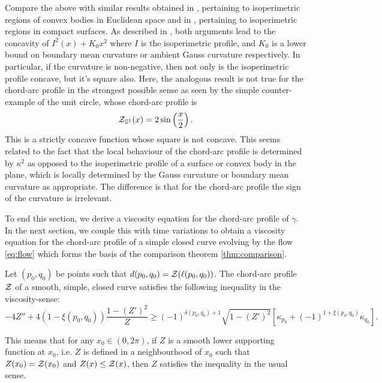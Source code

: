 \documentclass[a4paper, 12pt]{amsart}
\begin{document}
\begin{rem}
Compare the above with similar results obtained in \cite{MR1674097}, pertaining to isoperimetric regions of convex bodies in Euclidean space and in \cite{MR875084}, pertaining to isoperimetric regions in compact surfaces. As described in \cite{pbthesis}, both arguments lead to the concavity of $I^2(x) + K_0 x^2$ where $I$ is the isoperimetric profile, and $K_0$ is a lower bound on boundary mean curvature or ambient Gauss curvature respectively. In particular, if the curvature is non-negative, then not only is the isoperimetric profile concave, but it's square also. Here, the analogous result is not true for the chord-arc profile in the strongest possible sense as seen by the simple counter-example of the unit circle, whose chord-arc profile is 
\[
\operatorname{\mathcal{Z}}_{\mathbb{S}^1} (x) = 2 \sin \left(\frac{x}{2}\right).
\]
This is a strictly concave function whose square is not concave. This seems related to the fact that the local behaviour of the chord-arc profile is determined by $\kappa^2$ as opposed to the isoperimetric profile of a surface or convex body in the plane, which is locally determined by the Gauss curvature or boundary mean curvature as appropriate. The difference is that for the chord-arc profile the sign of the curvature is irrelevant.
\end{rem}

To end this section, we derive a viscosity equation for the chord-arc profile of $\gamma$. In the next section, we couple this with time variations to obtain a viscosity equation for the chord-arc profile of a simple closed curve evolving by the flow \ref{eq:flow} which forms the basis of the comparison theorem \ref{thm:comparison}. 

\begin{thm}
\label{thm:spatial_viscosity}
Let $(p_0,q_0)$ be points such that $d(p_0, q_0) = \operatorname{\mathcal{Z}}(\ell(p_0, q_0))$. The chord-arc profile $\operatorname{\mathcal{Z}}$ of a smooth, simple, closed curve satisfies the following inequality in the viscosity-sense:
\[
-4Z'' + 4(1-\xi(p_0,q_0)) \frac{1 - (Z')^2}{Z} \geq (-1)^{\delta(p_0,q_0)+1} \sqrt{1 - (Z')^2} \left[\kappa_{p_0} + (-1)^{1+\xi(p_0,q_0)} \kappa_{q_0}\right].
\]
\end{thm}

This means that for any $x_0 \in (0,2\pi)$, if $Z$ is a smooth lower supporting function at $x_0$, i.e. $Z$ is defined in a neighbourhood of $x_0$ such that $Z(x_0) = \operatorname{\mathcal{Z}} (x_0)$ and $Z(x) \leq \operatorname{\mathcal{Z}} (x)$, then $Z$ satisfies the inequality in the usual sense.
\end{document}
